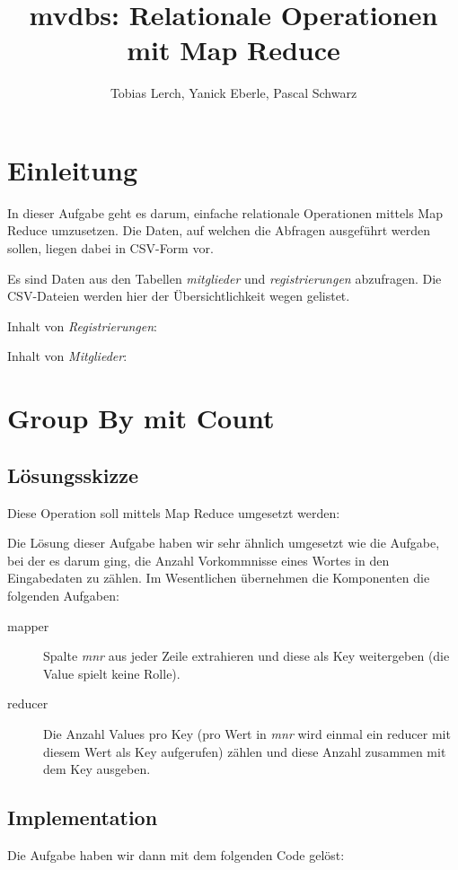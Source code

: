 \documentclass[11pt,a4paper,parskip=half]{scrartcl}
\title{mvdbs: Relationale Operationen mit Map Reduce}
\author{Tobias Lerch, Yanick Eberle, Pascal Schwarz}
\begin{document}
\maketitle

\pagestyle{fancy}
\section{Einleitung}
In dieser Aufgabe geht es darum, einfache relationale Operationen mittels Map Reduce umzusetzen. Die Daten, auf welchen die Abfragen ausgeführt werden sollen, liegen dabei in CSV-Form vor.

Es sind Daten aus den Tabellen \emph{mitglieder} und \emph{registrierungen} abzufragen. Die CSV-Dateien werden hier der Übersichtlichkeit wegen gelistet.

Inhalt von \emph{Registrierungen}:


Inhalt von \emph{Mitglieder}:


\newpage
\section{Group By mit Count}
\subsection{Lösungsskizze}
Diese Operation soll mittels Map Reduce umgesetzt werden:


Die Lösung dieser Aufgabe haben wir sehr ähnlich umgesetzt wie die Aufgabe, bei der es darum ging, die Anzahl Vorkommnisse eines Wortes in den Eingabedaten zu zählen. Im Wesentlichen übernehmen die Komponenten die folgenden Aufgaben:

\begin{description}
	\item[mapper] Spalte \emph{mnr} aus jeder Zeile extrahieren und diese als Key weitergeben (die Value spielt keine Rolle).
	\item[reducer] Die Anzahl Values pro Key (pro Wert in \emph{mnr} wird einmal ein reducer mit diesem Wert als Key aufgerufen) zählen und diese Anzahl zusammen mit dem Key ausgeben.
\end{description}

\subsection{Implementation}
Die Aufgabe haben wir dann mit dem folgenden Code gelöst:

\end{document}
